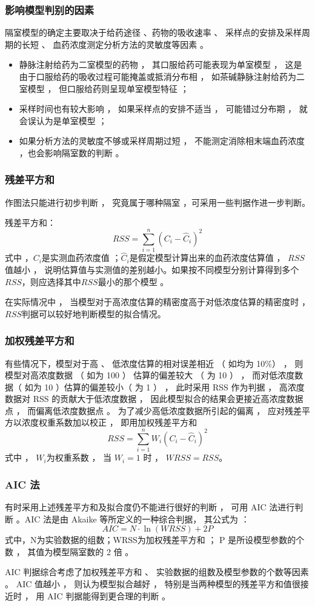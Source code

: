 \documentclass[dvipsnames, svgnames, x11names]{beamer}
\begin{document}
\begin{frame}
    \frametitle{影响模型判别的因素}
    隔室模型的确定主要取决于给药途径 、药物的吸收速率 、 采样点的安排及采样周期的长短 、 血药浓度测定分析方法的灵敏度等因素 。
    \begin{itemize}
      \item 静脉注射给药为二室模型的药物 ， 其口服给药可能表现为单室模型 ， 这是由于口服给药的吸收过程可能掩盖或抵消分布相 ， 如茶碱静脉注射给药为二室模型 ， 但口服给药则呈现单室模型特征 ；
      \item 采样时间也有较大影响 ， 如果采样点的安排不适当 ， 可能错过分布期 ， 就会误认为是单室模型 ；
      \item  如果分析方法的灵敏度不够或采样周期过短 ， 不能测定消除相末端血药浓度 ，也会影响隔室数的判断 。
    \end{itemize}
\end{frame}


\begin{frame}
    \frametitle{残差平方和}
    作图法只能进行初步判断 ， 究竟属于哪种隔室 ，可采用一些判据作进一步判断。

    残差平方和：
    \[
        RSS=\sum_{i=1}^{n}(C_{i}-\hat{C}_{i})^{2}
    \]
    式中 ，$C_{i}$是实测血药浓度值 ；$\hat{C}_{i}$是假定模型计算出来的血药浓度估算值 ， $RSS$值越小 ， 说明估算值与实测值的差别越小。如果按不同模型分别计算得到多个$RSS$，则应选择其中$RSS$最小的那个模型 。

    在实际情况中 ， 当模型对于高浓度估算的精密度高于对低浓度估算的精密度时 ， $RSS$判据可以较好地判断模型的拟合情况。
\end{frame}


\begin{frame}
    \frametitle{加权残差平方和}
    有些情况下，模型对于高 、 低浓度估算的相对误差相近 （ 如均为 10\%） ， 则模型对高浓度数据 （ 如为 100 ） 估算的偏差较大 （ 为 10 ） ， 而对低浓度数据（ 如为 10 ）估算的偏差较小（ 为 1 ） ， 此时采用 RSS 作为判据 ， 高浓度数据对 RSS 的贡献大于低浓度数据 ， 因此模型拟合的结果会更接近高浓度数据点 ， 而偏离低浓度数据点 。 为了减少高低浓度数据所引起的偏离 ， 应对残差平方以浓度权重系数加以校正 ， 即用加权残差平方和
    \[
        RSS=\sum_{i=1}^{n}W_i(C_{i}-\hat{C}_{i})^{2}
    \]
    式中 ， $W_i$为权重系数 ， 当 $W_i= 1$ 时 ， $WRSS=RSS$。
\end{frame}


\begin{frame}
    \frametitle{AIC 法}
    有时采用上述残差平方和及拟合度仍不能进行很好的判断 ， 可用 AIC 法进行判断 。AIC 法是由 Akaike 等所定义的一种综合判据， 其公式为 ：
    \[
        AIC=N\cdot\ln{(WRSS)}+2P
    \]
    式中，N为实验数据的组数；WRSS为加权残差平方和 ； P 是所设模型参数的个数 ， 其值为模型隔室数的 2 倍 。

    AIC 判据综合考虑了加权残差平方和 、 实验数据的组数及模型参数的个数等因素 。 AIC 值越小 ， 则认为模型拟合越好 ， 特别是当两种模型的残差平方和值很接近时 ， 用 AIC 判据能得到更合理的判断 。
\end{frame}
\end{document}
